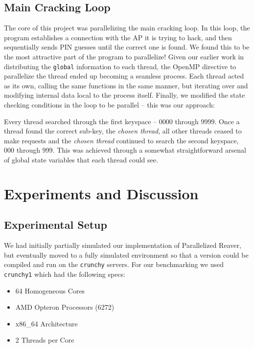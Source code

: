 \documentclass[a4paper]{article}
\begin{document}
\subsection{Main Cracking Loop}

The core of this project was parallelizing the main cracking loop. In this loop, 
the program establishes a connection with the AP it is trying to hack, and then
sequentially sends PIN guesses until the correct one is found. We found this to be
the most attractive part of the program to parallelize! Given our earlier work in
distributing the \texttt{global} information to each thread, the OpenMP directive
to parallelize the thread ended up becoming a seamless process. Each thread acted
as its own, calling the same functions in the same manner, but iterating over and
modifying internal data local to the process itself. Finally, we modified the 
state checking conditions in the loop to be parallel -- this was our approach:

Every thread searched through the first keyspace -- 0000 through 9999. Once a thread
found the correct sub-key, the \textit{chosen thread}, all other threads ceased to 
make requests and the \textit{chosen thread} continued to search the second keyspace, 
000 through 999. This was achieved through a somewhat straightforward arsenal of
global state variables that each thread could see.

\section{Experiments and Discussion}

\subsection{Experimental Setup}

We had initially partially simulated our implementation of Parallelized Reaver, but eventually
moved to a fully simulated environment so that a version could be compiled and run on the
\verb+crunchy+ servers. For our benchmarking we used \verb+crunchy1+ 
which had the following specs:

\begin{itemize}
    \item 64 Homogeneous Cores
    \item AMD Opteron Processors (6272)
    \item x86\_64 Architecture
    \item 2 Threads per Core
\end{itemize}
\end{document}
